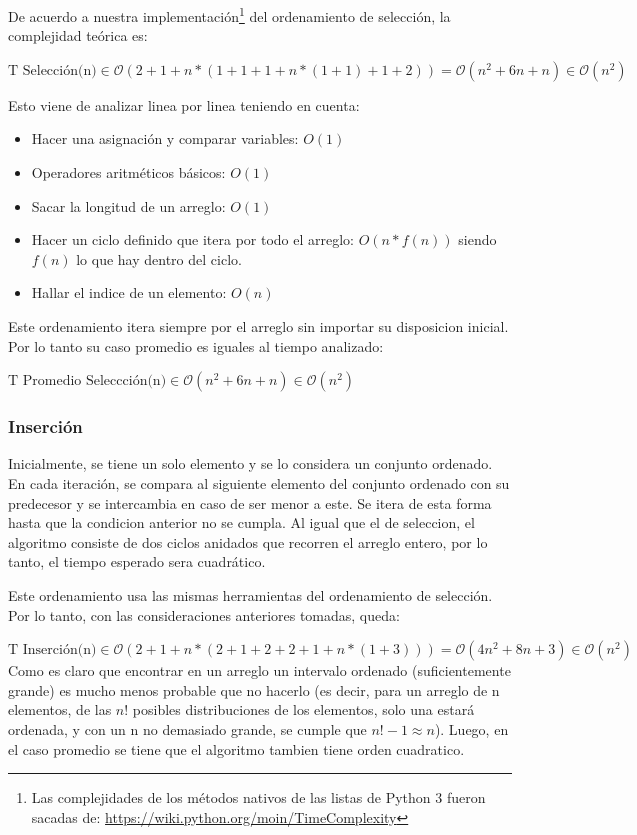 \documentclass[article,a4paper]{article}
\newcommand{\bigO}{\mathcal{O}}
\begin{document}
De acuerdo a nuestra implementación\footnote{Las complejidades de los métodos nativos de las listas de Python 3 fueron sacadas de: \url{https://wiki.python.org/moin/TimeComplexity}} del ordenamiento de selección, la complejidad teórica es:

$\mbox{T Selección(n)} \in \bigO(2 + 1 + n * (1 + 1 + 1 + n * (1 + 1) + 1 + 2)) = \bigO(n^2 + 6n + n) \in \bigO(n^2)$

Esto viene de analizar linea por linea teniendo en cuenta:
\begin{itemize}
\item Hacer una asignación y comparar variables: $O(1)$
\item Operadores aritméticos básicos: $O(1)$
\item Sacar la longitud de un arreglo: $O(1)$
\item Hacer un ciclo definido que itera por todo el arreglo: $O(n * f(n))$ siendo $f(n)$ lo que hay dentro del ciclo.
\item Hallar el indice de un elemento: $O(n)$
\end{itemize}

Este ordenamiento itera siempre por el arreglo sin importar su disposicion inicial. Por lo tanto su caso promedio es iguales al tiempo analizado:

$\mbox{T Promedio Seleccción(n)} \in \bigO(n^2 + 6n + n) \in \bigO(n^2)$


\subsubsection{Inserción}

Inicialmente, se tiene un solo elemento y se lo considera un conjunto ordenado. En cada iteración, se compara al siguiente elemento del conjunto ordenado con su predecesor y se intercambia en caso de ser menor a este. Se itera de esta forma hasta que la condicion anterior no se cumpla. Al igual que el de seleccion, el algoritmo consiste de dos ciclos anidados que recorren el arreglo entero, por lo tanto, el tiempo esperado sera cuadrático.

Este ordenamiento usa las mismas herramientas del ordenamiento de selección. Por lo tanto, con las consideraciones anteriores tomadas, queda:

$\mbox{T Inserción(n)} \in \bigO( 2 + 1 + n * (2 + 1 + 2 + 2 + 1 + n * (1 + 3))) = \bigO(4n^2 + 8n + 3) \in \bigO(n^2)$\\

Como es claro que encontrar en un arreglo un intervalo ordenado (suficientemente grande) es mucho menos probable que no hacerlo (es decir, para un arreglo de n elementos, de las $n!$ posibles distribuciones de los elementos, solo una estará ordenada, y con un n no demasiado grande, se cumple que $n!-1 \approx n$). Luego, en el caso promedio se tiene que el algoritmo tambien tiene orden cuadratico.
\end{document}
